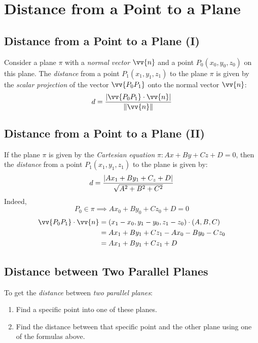 \section{Distance from a Point to a Plane}
\subsection{Distance from a Point to a Plane (I)}
	Consider a plane $\pi$ with a \emph{normal vector} $\vv{n}$ and a point $P_0(x_0,y_0,z_0)$ on this plane. The \emph{distance} from a point $P_1(x_1,y_1,z_1)$ to the plane $\pi$ is given by the \emph{scalar projection} of the vector $\vv{P_0P_1}$ onto the normal vector $\vv{n}$:
	\begin{equation}\label{eq:9.6:scalarPointPlaneDist}
		d = \frac{\abs{\vv{P_0P_1} \cdot \vv{n}}}{\norm{\vv{n}}}
	\end{equation}
\subsection{Distance from a Point to a Plane (II)}
	If the plane $\pi$ is given by the \emph{Cartesian equation} $\pi: Ax + By + Cz + D = 0$, then the \emph{distance} from a point $P_1(x_1,y_1,z_1)$ to the plane is given by:
	\begin{equation}\label{eq:9.6:pointPlaneDist}
		d = \frac{\lvert Ax_1 + By_1 + C_z + D \rvert}{\sqrt{A^2 + B^2 + C^2}}
	\end{equation}
	Indeed,
	\[P_0 \in \pi \implies Ax_0 + By_0 + Cz_0 + D = 0\]
	\begin{align*}
		\vv{P_0P_1} \cdot \vv{n} &= (x_1 - x_0, y_1 - y_0, z_1 - z_0) \cdot (A, B, C)\\
		                         &= Ax_1 + By_1 + Cz_1 - Ax_0 - By_0 - Cz_0\\
					 &= Ax_1 + By_1 + Cz_1 + D
	\end{align*}
\subsection{Distance between Two Parallel Planes}
	To get the \emph{distance} between \emph{two parallel planes}:
	\begin{enumerate}
		\item Find a specific point into one of these planes.
		\item Find the distance between that specific point and the other plane using one of the formulas above.
	\end{enumerate}
